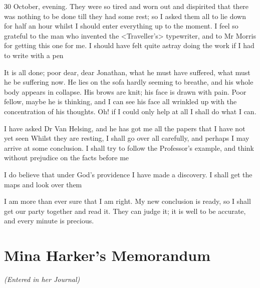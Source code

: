 \begin{diary}{30 October, evening.}
They were so tired and worn out and dispirited that there was nothing to be done till they had some rest; so I asked them all to lie down for half an hour whilst I should enter everything up to the moment. I feel so grateful to the man who invented the <Traveller's> typewriter, and to Mr Morris for getting this one for me. I should have felt quite astray doing the work if I had to write with a pen

It is all done; poor dear, dear Jonathan, what he must have suffered, what must he be suffering now. He lies on the sofa hardly seeming to breathe, and his whole body appears in collapse. His brows are knit; his face is drawn with pain. Poor fellow, maybe he is thinking, and I can see his face all wrinkled up with the concentration of his thoughts. Oh! if I could only help at all I shall do what I can.

I have asked Dr Van Helsing, and he has got me all the papers that I have not yet seen Whilst they are resting, I shall go over all carefully, and perhaps I may arrive at some conclusion. I shall try to follow the Professor's example, and think without prejudice on the facts before me

I do believe that under God's providence I have made a discovery. I shall get the maps and look over them

I am more than ever sure that I am right. My new conclusion is ready, so I shall get our party together and read it. They can judge it; it is well to be accurate, and every minute is precious.
\end{diary}


\section{Mina Harker's Memorandum}
\begin{center}\itshape (Entered in her Journal)\end{center}


